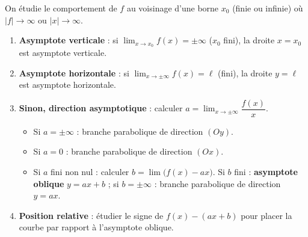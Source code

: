\documentclass[11pt]{article}
\newcommand{\cle}[1]{{\popxbold\color{popdark}#1}}
\begin{document}
\begin{methode}
On étudie le comportement de $f$ au voisinage d'une borne $x_0$ (finie ou infinie) où $|f|\to\infty$ ou $|x|\to\infty$.
\begin{enumerate}
\item \textbf{Asymptote verticale} : si $\lim_{x\to x_0}f(x)=\pm\infty$ ($x_0$ fini), la droite $x=x_0$ est asymptote verticale.
\item \textbf{Asymptote horizontale} : si $\lim_{x\to\pm\infty}f(x)=\ell$ (fini), la droite $y=\ell$ est asymptote horizontale.
\item \textbf{Sinon, direction asymptotique} : calculer $a=\lim_{x\to\pm\infty}\dfrac{f(x)}{x}$.
\begin{itemize}
\item Si $a=\pm\infty$ : \cle{branche parabolique} de direction $(Oy)$.
\item Si $a=0$ : branche parabolique de direction $(Ox)$.
\item Si $a$ fini non nul : calculer $b=\lim\bigl(f(x)-ax\bigr)$. Si $b$ fini : \textbf{asymptote oblique} $y=ax+b$ ; si $b=\pm\infty$ : branche parabolique de direction $y=ax$.
\end{itemize}
\item \textbf{Position relative} : étudier le signe de $f(x)-(ax+b)$ pour placer la courbe par rapport à l'asymptote oblique.
\end{enumerate}
\end{methode}
\end{document}
